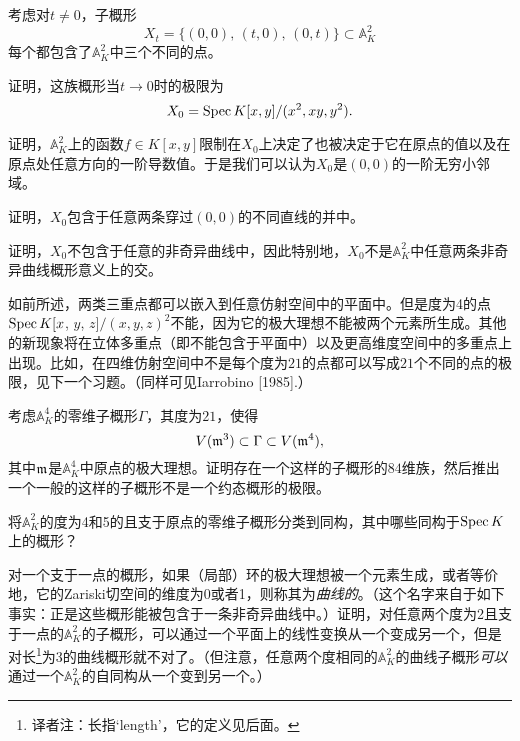 \begin{exe}
	考虑对$t\neq 0$，子概形
	\[
	X_t=\{\text{$(0,0)$, $(t,0)$, $(0,t)$}\}\subset \mathbb{A}_K^2
	\]
	每个都包含了$\mathbb{A}_{K}^2$中三个不同的点。

	\begin{compactenum}[(a)]
		\item 证明，这族概形当$t\to 0$时的极限为
		\[
		X_0=\operatorname{Spec} K[x,y]/(x^2,xy,y^2).
		\]
		\item 证明，$\mathbb{A}_K^2$上的函数$f\in K[x,y]$限制在$X_0$上决定了也被决定于它在原点的值以及在原点处任意方向的一阶导数值。于是我们可以认为$X_0$是$(0,0)$的一阶无穷小邻域。
		\item 证明，$X_0$包含于任意两条穿过$(0,0)$的不同直线的并中。
		\item 证明，$X_0$不包含于任意的非奇异曲线中，因此特别地，$X_0$不是$\mathbb{A}_K^2$中任意两条非奇异曲线概形意义上的交。
	\end{compactenum}
\end{exe}

如前所述，两类三重点都可以嵌入到任意仿射空间中的平面中。但是度为4的点$\operatorname{Spec} K[x$, $y$, $z]/(x,y,z)^2$不能，因为它的极大理想不能被两个元素所生成。其他的新现象将在立体多重点（即不能包含于平面中）以及更高维度空间中的多重点上出现。比如，在四维仿射空间中不是每个度为$21$的点都可以写成$21$个不同的点的极限，见下一个习题。（同样可见Iarrobino [1985].）

\begin{exe}
	考虑$\mathbb{A}_K^4$的零维子概形$\Gamma$，其度为$21$，使得
	\[
	V(\mathfrak{m}^3)\subset \Gamma \subset V(\mathfrak{m}^4),
	\]
	其中$\mathfrak{m}$是$\mathbb{A}_K^4$中原点的极大理想。证明存在一个这样的子概形的$84$维族，然后推出一个一般的这样的子概形不是一个约态概形的极限。
\end{exe}

\begin{exe}
	将$\mathbb{A}_K^2$的度为4和5的且支于原点的零维子概形分类到同构，其中哪些同构于$\operatorname{Spec} K$上的概形？
\end{exe}

\begin{exe}
	对一个支于一点的概形，如果（局部）环的极大理想被一个元素生成，或者等价地，它的Zariski切空间的维度为0或者1，则称其为\textit{曲线的}。（这个名字来自于如下事实：正是这些概形能被包含于一条非奇异曲线中。）证明，对任意两个度为2且支于一点的$\mathbb{A}_K^2$的子概形，可以通过一个平面上的线性变换从一个变成另一个，但是对长\footnote{译者注：长指`length'，它的定义见后面。}为3的曲线概形就不对了。（但注意，任意两个度相同的$\mathbb{A}_K^2$的曲线子概形\textit{可以}通过一个$\mathbb{A}_K^2$的自同构从一个变到另一个。）
\end{exe}

